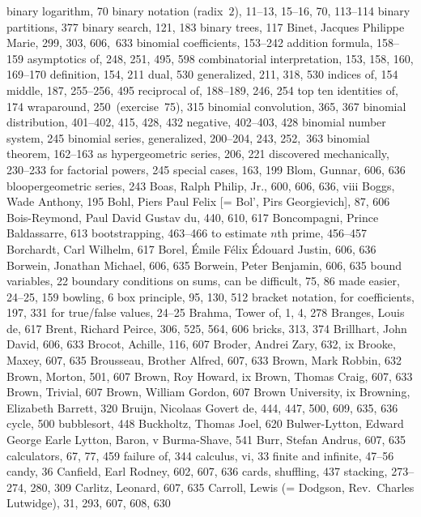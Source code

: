 binary logarithm, 70
binary notation (radix~$2$), 11--13, 15--16, 70, 113--114
binary partitions, 377
binary search, 121, 183
binary trees, 117
Binet, Jacques Philippe Marie, 299, 303, 606,~633
binomial coefficients, 153--242
\sub addition formula, 158--159
\sub asymptotics of, 248, 251, 495, 598
\sub combinatorial interpretation, 153, 158, 160, 169--170
\sub definition, 154, 211
\sub dual, 530
\sub generalized, 211, 318, 530
\sub indices of, 154
\sub middle, 187, 255--256, 495
\sub reciprocal of, 188--189, 246, 254
\sub top ten identities of, 174
\sub wraparound, 250~(exercise~75), 315
binomial convolution, 365, 367
binomial distribution, 401--402, 415, 428, 432
\sub negative, 402--403, 428
binomial number system, 245
binomial series, generalized, 200--204, 243, 252,~363
binomial theorem, 162--163
\sub as hypergeometric series, 206, 221
\sub discovered mechanically, 230--233
\sub for factorial powers, 245
\sub special cases, 163, 199
Blom, Gunnar, 606, 636
bloopergeometric series, 243
Boas, Ralph Philip, Jr., 600, 606, 636, viii
Boggs, Wade Anthony, 195
Bohl, Piers Paul Felix [= Bol', Pirs Georgievich], 87, 606
Bois-Reymond, Paul David Gustav du, 440, 610, 617
Boncompagni, Prince Baldassarre, 613
bootstrapping, 463--466
\sub to estimate $n$th prime, 456--457
Borchardt, Carl Wilhelm, 617
Borel, \'Emile F\'elix \'Edouard Justin, 606, 636
Borwein, Jonathan Michael, 606, 635
Borwein, Peter Benjamin, 606, 635
bound variables, 22
boundary conditions on sums,
\sub can be difficult, 75, 86
\sub made easier, 24--25, 159
bowling, 6
box principle, 95, 130, 512
bracket notation,
\sub for coefficients, 197, 331
\sub for true/false values, 24--25
Brahma, Tower of, 1, 4, 278
Branges, Louis de, 617
Brent, Richard Peirce, 306, 525, 564, 606
bricks, 313, 374
Brillhart, John David, 606, 633
Brocot, Achille, 116, 607
Broder, Andrei Zary, 632, ix
Brooke, Maxey, 607, 635
Brousseau, Brother Alfred, 607, 633
Brown, Mark Robbin, 632
Brown, Morton, 501, 607
Brown, Roy Howard, ix
Brown, Thomas Craig, 607, 633
Brown, Trivial, 607
Brown, William Gordon, 607
Brown University, ix
Browning, Elizabeth Barrett, 320
Bruijn, Nicolaas Govert de, 444, 447, 500, 609, 635, 636
\sub cycle, 500
bubblesort, 448
Buckholtz, Thomas Joel, 620
Bulwer-Lytton, Edward George Earle Lytton, Baron, v
Burma-Shave, 541
Burr, Stefan Andrus, 607, 635
\medskip
calculators, 67, 77, 459
\sub failure of, 344
calculus, vi, 33
\sub finite and infinite, 47--56
candy, 36
Canfield, Earl Rodney, 602, 607, 636
cards,
\sub shuffling, 437
\sub stacking, 273--274, 280, 309
Carlitz, Leonard, 607, 635
Carroll, Lewis (= Dodgson, Rev.~Charles Lutwidge), 31, 293, 607, 608, 630
